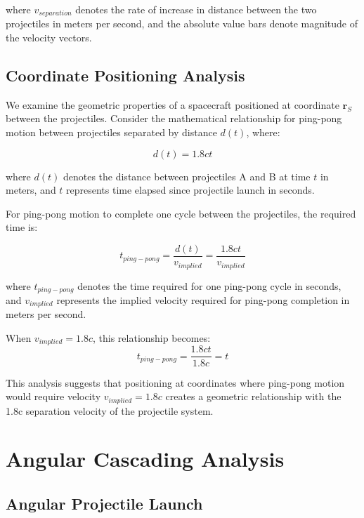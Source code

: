 \documentclass[12pt,a4paper]{article}
\begin{document}
where $v_{separation}$ denotes the rate of increase in distance between the two projectiles in meters per second, and the absolute value bars denote magnitude of the velocity vectors.

\subsection{Coordinate Positioning Analysis}

We examine the geometric properties of a spacecraft positioned at coordinate $\mathbf{r}_S$ between the projectiles. Consider the mathematical relationship for ping-pong motion between projectiles separated by distance $d(t)$, where:

\begin{equation}
d(t) = 1.8ct
\end{equation}

where $d(t)$ denotes the distance between projectiles A and B at time $t$ in meters, and $t$ represents time elapsed since projectile launch in seconds.

For ping-pong motion to complete one cycle between the projectiles, the required time is:

\begin{equation}
t_{ping-pong} = \frac{d(t)}{v_{implied}} = \frac{1.8ct}{v_{implied}}
\end{equation}

where $t_{ping-pong}$ denotes the time required for one ping-pong cycle in seconds, and $v_{implied}$ represents the implied velocity required for ping-pong completion in meters per second.

When $v_{implied} = 1.8c$, this relationship becomes:
\begin{equation}
t_{ping-pong} = \frac{1.8ct}{1.8c} = t
\end{equation}

This analysis suggests that positioning at coordinates where ping-pong motion would require velocity $v_{implied} = 1.8c$ creates a geometric relationship with the 1.8c separation velocity of the projectile system.

\section{Angular Cascading Analysis}

\subsection{Angular Projectile Launch}
\end{document}
